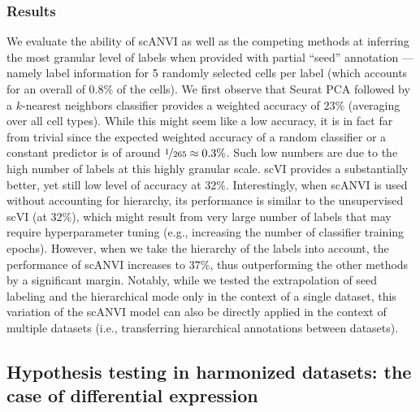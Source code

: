 \subsubsection{Results}
We evaluate the ability of scANVI as well as the competing methods at inferring the most granular level of labels when provided with partial ``seed'' annotation --- namely label information for 5 randomly selected cells per label (which accounts for an overall of $0.8 \%$ of the cells). We first observe that Seurat PCA followed by a $k$-nearest neighbors classifier provides a weighted accuracy of $23 \%$ (averaging over all cell types). While this might seem like a low accuracy, it is in fact far from trivial since the expected weighted accuracy of a random classifier or a constant predictor is of around $\nicefrac{1}{265} \approx 0.3 \%$. Such low numbers are due to the high number of labels at this highly granular scale. scVI provides a substantially better, yet still low level of accuracy at $32 \%$. Interestingly, when scANVI is used without accounting for hierarchy, its performance is similar to the unsupervised scVI (at $32 \%$), which might result from very large number of labels that may require hyperparameter tuning (e.g., increasing the number of classifier training epochs). However, when we take the hierarchy of the labels into account, the performance of scANVI increases to $37 \%$, thus outperforming the other methods by a significant margin. Notably, while we tested the extrapolation of seed labeling and the hierarchical mode only in the context of a single dataset, this variation of the scANVI model can also be directly applied in the context of multiple datasets (i.e., transferring hierarchical annotations between datasets).


\subsection[Differential expression in harmonized datasets]{Hypothesis testing in harmonized datasets: the case of differential expression}


